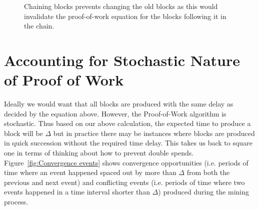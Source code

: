 \begin{figure}[H]
	\caption{Chaining blocks prevents changing the old blocks as this would invalidate the proof-of-work equation for the blocks following it in the chain.}
	\label{fig:Blockchain}  %
\end{figure}

\section{Accounting for Stochastic Nature of Proof of Work}

Ideally we would want that all blocks are produced with the same delay as decided by the equation above. However, the Proof-of-Work algorithm is stochastic. Thus based on our above calculation, the expected time to produce a block will be $\Delta$ but in practice there may be instances where blocks are produced in quick succession without the required time delay. This takes us back to square one in terms of thinking about how to prevent double spends. Figure~\ref{fig:Convergence events} shows convergence opportunities (i.e. periods of time where an event happened spaced out by more than $\Delta$ from both the previous and next event) and conflicting events (i.e. periods of time where two events happened in a time interval shorter than $\Delta$) produced during the mining process.

